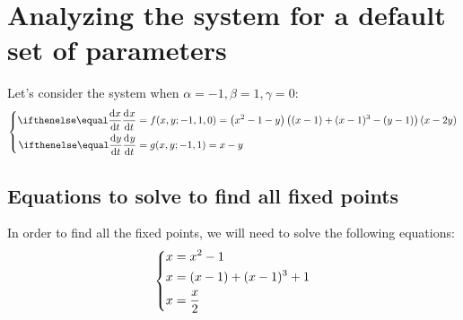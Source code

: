 \section{Analyzing the system for a default set of parameters}\label{sec:analyzing-the-system-for-a-default-set-of-parameters}
Let's consider the system when $\alpha=-1,\beta=1,\gamma=0$:
\begin{equation}
    \begin{dcases}
        \begin{aligned}
            \diff[]{x}{t} &= f(x,y;-1,1,0) = \left(x^2-1-y\right)\left((x-1)+(x-1)^3-(y-1)\right)\left(x-2y\right)\\
            \diff[]{y}{t} &= g(x,y;-1,1) = x-y
        \end{aligned}
    \end{dcases}
    \label{eq:4}
\end{equation}

\subsection{Equations to solve to find all fixed points}\label{subsec:equations-to-solve-to-find-all-fixed-points}
In order to find all the fixed points, we will need to solve the following equations:
\begin{equation*}
    \begin{dcases}
        \begin{aligned}
            x &= x^2-1\\
            x &= (x-1)+(x-1)^3+1\\
            x &= \frac{x}{2}
        \end{aligned}
    \end{dcases}
\end{equation*}

